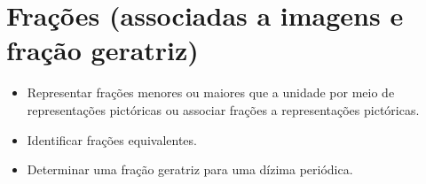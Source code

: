 \pagestyle{mat}
\chapter{Frações (associadas a imagens e fração geratriz)}


\begin{itemize}

  \item Representar frações menores ou maiores que a unidade por meio de
representações pictóricas ou associar frações a representações pictóricas.
  \item Identificar frações equivalentes.
  \item Determinar uma fração geratriz para uma dízima periódica.   

\end{itemize} 

